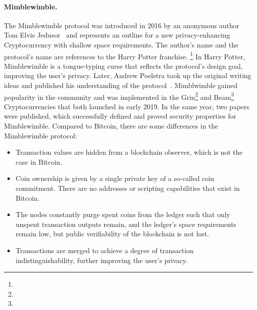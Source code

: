 \paragraph{Mimblewimble.} The Mimblewimble protocol was introduced in 2016 by an anonymous author Tom Elvis Jedusor~\cite{jedusor2016mimblewimble} and represents an outline for a new privacy-enhancing Cryptocurrency with shallow space requirements.
The author’s name and the protocol's name are references to the Harry Potter franchise. \footnote{\urlharrypotter}
In Harry Potter, Mimblewimble is a tongue-typing curse that reflects the protocol's design goal, improving the user's privacy.
Later, Andrew Poelstra took up the original writing ideas and published his understanding of the protocol~\cite{poelstra2016mimblewimble}.
Mimblwimble gained popularity in the community and was implemented in the Grin\footnote{\urlgrin} and Beam\footnote{\urlbeam} Cryptocurrencies that both launched in early 2019.
In the same year, two papers~\cite{fuchsbauer2019aggregate,betarte2019towards} were published, which successfully defined and proved security properties for Mimblewimble.
Compared to Bitcoin, there are some differences in the Mimblewimble protocol:
\begin{itemize}
    \item Transaction values are hidden from a blockchain observer, which is not the case in Bitcoin.
    \item Coin ownership is given by a single private key of a so-called coin commitment. There are no addresses or scripting capabilities that exist in Bitcoin.
    \item The nodes constantly purge spent coins from the ledger such that only unspent transaction outputs remain, and the ledger's space requirements remain low, but public verifiability of the blockchain is not lost.
    \item Transactions are merged to achieve a degree of transaction indistinguishability, further improving the user's privacy.
\end{itemize}

